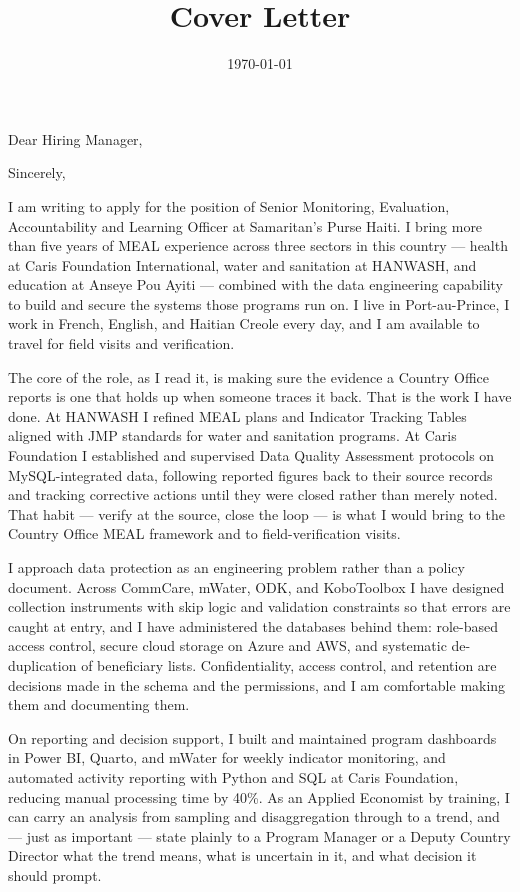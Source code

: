 \documentclass[11pt,a4paper,sans]{moderncv}
\title{Cover Letter}
\begin{document}
\date{\today}
\opening{Dear Hiring Manager,}
\closing{Sincerely,}

\makelettertitle

I am writing to apply for the position of Senior Monitoring, Evaluation, Accountability and Learning Officer at Samaritan's Purse Haiti. I bring more than five years of MEAL experience across three sectors in this country --- health at Caris Foundation International, water and sanitation at HANWASH, and education at Anseye Pou Ayiti --- combined with the data engineering capability to build and secure the systems those programs run on. I live in Port-au-Prince, I work in French, English, and Haitian Creole every day, and I am available to travel for field visits and verification.

The core of the role, as I read it, is making sure the evidence a Country Office reports is one that holds up when someone traces it back. That is the work I have done. At HANWASH I refined MEAL plans and Indicator Tracking Tables aligned with JMP standards for water and sanitation programs. At Caris Foundation I established and supervised Data Quality Assessment protocols on MySQL-integrated data, following reported figures back to their source records and tracking corrective actions until they were closed rather than merely noted. That habit --- verify at the source, close the loop --- is what I would bring to the Country Office MEAL framework and to field-verification visits.

I approach data protection as an engineering problem rather than a policy document. Across CommCare, mWater, ODK, and KoboToolbox I have designed collection instruments with skip logic and validation constraints so that errors are caught at entry, and I have administered the databases behind them: role-based access control, secure cloud storage on Azure and AWS, and systematic de-duplication of beneficiary lists. Confidentiality, access control, and retention are decisions made in the schema and the permissions, and I am comfortable making them and documenting them.

On reporting and decision support, I built and maintained program dashboards in Power BI, Quarto, and mWater for weekly indicator monitoring, and automated activity reporting with Python and SQL at Caris Foundation, reducing manual processing time by 40\%. As an Applied Economist by training, I can carry an analysis from sampling and disaggregation through to a trend, and --- just as important --- state plainly to a Program Manager or a Deputy Country Director what the trend means, what is uncertain in it, and what decision it should prompt.
\end{document}
